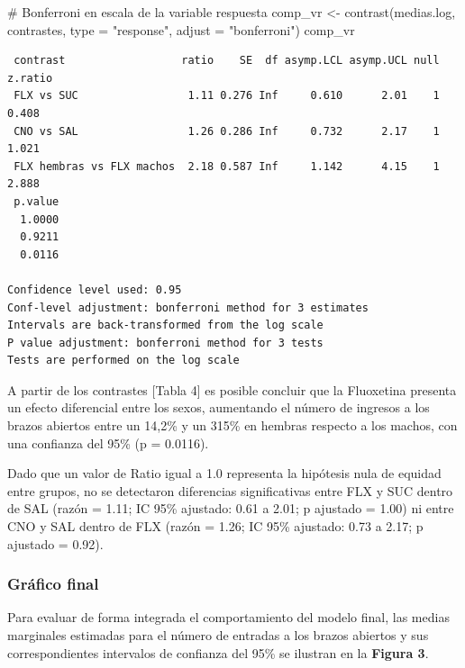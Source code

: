 \documentclass[
  letterpaper,
  DIV=11,
  numbers=noendperiod]{scrartcl}
\newenvironment{Shaded}{\begin{snugshade}}{\end{snugshade}}
\newcommand{\AttributeTok}[1]{\textcolor[rgb]{0.40,0.45,0.13}{#1}}
\newcommand{\CommentTok}[1]{\textcolor[rgb]{0.37,0.37,0.37}{#1}}
\newcommand{\FunctionTok}[1]{\textcolor[rgb]{0.28,0.35,0.67}{#1}}
\newcommand{\NormalTok}[1]{\textcolor[rgb]{0.00,0.23,0.31}{#1}}
\newcommand{\OtherTok}[1]{\textcolor[rgb]{0.00,0.23,0.31}{#1}}
\newcommand{\StringTok}[1]{\textcolor[rgb]{0.13,0.47,0.30}{#1}}
\begin{document}
\begin{Shaded}
\begin{Highlighting}[]
\CommentTok{\# Bonferroni en escala de la variable respuesta}
\NormalTok{comp\_vr }\OtherTok{\textless{}{-}} \FunctionTok{contrast}\NormalTok{(medias.log, contrastes, }\AttributeTok{type =} \StringTok{"response"}\NormalTok{, }\AttributeTok{adjust =} \StringTok{"bonferroni"}\NormalTok{)}
\NormalTok{comp\_vr}
\end{Highlighting}
\end{Shaded}

\begin{verbatim}
 contrast                  ratio    SE  df asymp.LCL asymp.UCL null z.ratio
 FLX vs SUC                 1.11 0.276 Inf     0.610      2.01    1   0.408
 CNO vs SAL                 1.26 0.286 Inf     0.732      2.17    1   1.021
 FLX hembras vs FLX machos  2.18 0.587 Inf     1.142      4.15    1   2.888
 p.value
  1.0000
  0.9211
  0.0116

Confidence level used: 0.95 
Conf-level adjustment: bonferroni method for 3 estimates 
Intervals are back-transformed from the log scale 
P value adjustment: bonferroni method for 3 tests 
Tests are performed on the log scale 
\end{verbatim}

A partir de los contrastes {[}Tabla 4{]} es posible concluir que la
Fluoxetina presenta un efecto diferencial entre los sexos, aumentando el
número de ingresos a los brazos abiertos entre un 14,2\% y un 315\% en
hembras respecto a los machos, con una confianza del 95\% (p = 0.0116).

Dado que un valor de Ratio igual a 1.0 representa la hipótesis nula de
equidad entre grupos, no se detectaron diferencias significativas entre
FLX y SUC dentro de SAL (razón = 1.11; IC 95\% ajustado: 0.61 a 2.01; p
ajustado = 1.00) ni entre CNO y SAL dentro de FLX (razón = 1.26; IC 95\%
ajustado: 0.73 a 2.17; p ajustado = 0.92).

\subsubsection{Gráfico final}\label{gruxe1fico-final}

Para evaluar de forma integrada el comportamiento del modelo final, las
medias marginales estimadas para el número de entradas a los brazos
abiertos y sus correspondientes intervalos de confianza del 95\% se
ilustran en la \textbf{Figura 3}.~
\end{document}
